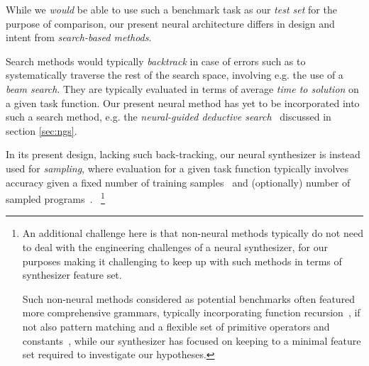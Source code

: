 \documentclass{article}
\begin{document}

While we \emph{would} be able to use such a benchmark task as our \emph{test set} for the purpose of comparison,
our present neural architecture differs in design and intent from \emph{search-based methods}.

Search methods would typically \emph{backtrack} in case of errors such as to systematically traverse the rest of the search space,
involving e.g. the use of a \emph{beam search}.
They are typically evaluated in terms of average \emph{time to solution} on a given task function.
Our present neural method has yet to be incorporated into such a search method,
e.g. the \emph{neural-guided deductive search}~\citep{deepcoder} discussed in section \ref{sec:ngs}.

In its present design, lacking such back-tracking,
our neural synthesizer is instead used for \emph{sampling},
where evaluation for a given task function typically involves accuracy given a fixed number of training samples~\citep{npi} and (optionally) number of sampled programs~\citep{nsps}.%
~\footnote{
    An additional challenge here is that non-neural methods typically do not need to deal with the engineering challenges of a neural synthesizer,
    for our purposes making it challenging to keep up with such methods in terms of synthesizer feature set.

    Such non-neural methods considered as potential benchmarks often featured more comprehensive grammars,
    typically incorporating function recursion~\citep{typedmil,myth},
    if not also pattern matching and a flexible set of primitive operators and constants~\citep{lambda2},
    while our synthesizer has focused on keeping to a minimal feature set required to investigate our hypotheses.
}

\end{document}
